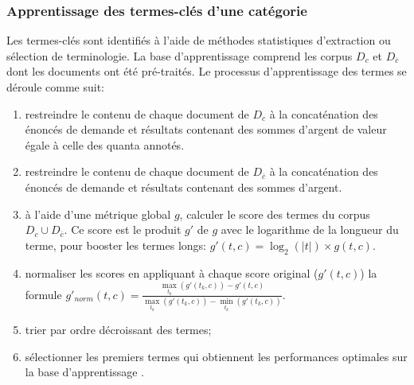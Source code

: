 \subsubsection{Apprentissage des termes-clés d'une catégorie}
Les termes-clés sont identifiés à l'aide de méthodes statistiques d'extraction ou sélection de terminologie. La base d'apprentissage comprend les corpus $D_c$ et $D_{\overline{c}}$ dont les documents ont été pré-traités. %
 Le processus d'apprentissage des termes se déroule comme suit:
 
 \begin{enumerate}
 	\item restreindre le contenu de chaque document de $D_c$ à la concaténation des énoncés de demande et résultats contenant des sommes d'argent de valeur égale à celle des quanta annotés.
 	\item restreindre le contenu de chaque document de  $D_{\overline{c}}$ à la concaténation des énoncés  de demande et résultats contenant des sommes d'argent.
 	\item à l'aide d'une métrique global $g$, calculer le score des termes du corpus $D_c \cup D_{\overline{c}}$. Ce score est le produit $g'$ de $g$ avec le logarithme de la longueur du terme, pour booster les termes longs: $g'(t,c) = \log_2(\vert t \vert) \times g(t, c)$.
 	\item normaliser les scores en appliquant à chaque score original ($g'(t,c)$) la formule $g'_{norm}(t,c) = \frac{\max\limits_{t_k} (g'(t_k,c)) - g'(t,c)}{\max\limits_{t_k} (g'(t_k,c)) - \min\limits_{t_k} (g'(t_k,c))}$. 
 	\item trier par ordre décroissant des termes;
 	\item sélectionner les premiers termes qui obtiennent les performances optimales sur la base d'apprentissage .
 \end{enumerate}


